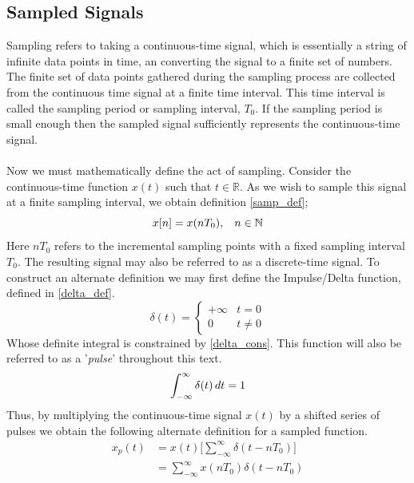 \subsection{Sampled Signals}
Sampling refers to taking a continuous-time signal, which is essentially a string of infinite data points in time, an converting the signal to a finite set of numbers. The finite set of data points gathered during the sampling process are collected from the continuous time signal at a finite time interval. This time interval is called the sampling period or sampling interval, $T_0$. If the sampling period is small enough then the sampled signal sufficiently represents the continuous-time signal.\\ \\
Now we must mathematically define the act of sampling. Consider the continuous-time function $x(t)$ such that $t \in \mathbb{R}$. As we wish to sample this signal at a finite sampling interval, we obtain definition \ref{samp_def};
\begin{equation}\label{samp_def}
    x[n] = x(nT_0), \hspace{3mm} n \in \mathbb{N}
\end{equation}
Here $nT_0$ refers to the incremental sampling points with a fixed sampling interval $T_0$. The resulting signal may also be referred to as a discrete-time signal. To construct an alternate definition we may first define the Impulse/Delta function, defined in \ref{delta_def}.
\begin{equation}\label{delta_def}
    \delta(t) =
\left\{
	\begin{array}{ll}
		+\infty  & t=0 \\
		0 & t \neq 0
	\end{array}
\right.
\end{equation}
Whose definite integral is constrained by \ref{delta_cons}. This function will also be referred to as a '\textit{pulse}' throughout this text.
\begin{equation}\label{delta_cons}
    \int_{-\infty}^{\infty} \delta(t) \,dt = 1 \\
\end{equation}
Thus, by multiplying the continuous-time signal $x(t)$ by a shifted series of pulses we obtain the following alternate definition for a sampled function.
\begin{align}\label{samp_def_2}
    x_p(t)  &= x(t) \Big[ \sum_{-\infty}^{\infty} \delta(t - nT_0) \Big] \nonumber \\
            &= \sum_{-\infty}^{\infty} x(nT_0)\delta(t-nT_0)
\end{align}

